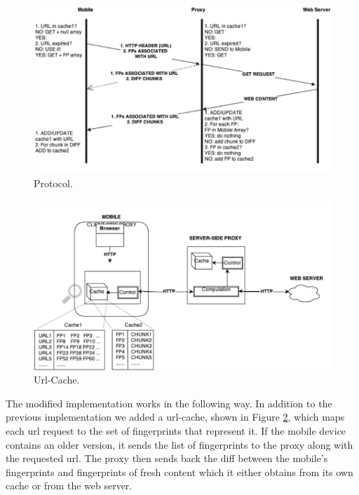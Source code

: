 \begin{figure}[h] 
\centering \includegraphics[width=\columnwidth]{images/urlcache-protocol.png}
\caption{Protocol. }
\label{fig:foo}
\end{figure} 
\begin{figure}[h] 
\centering \includegraphics[width=\columnwidth]{images/url-cache-hl.png}
\caption{Url-Cache. }
\label{fig:bar}
\end{figure} 

The modified implementation works in the following way. In addition to the previous implementation we added a url-cache, shown in Figure \ref{fig:bar}, which maps each url request to the set of fingerprints that represent it. If the mobile device contains an older version, it sends the list of fingerprints to the proxy along with the requested url. The proxy then sends back the diff between the mobile's fingerprints and fingerprints of fresh content which it either obtains from its own cache or from the web server. 

